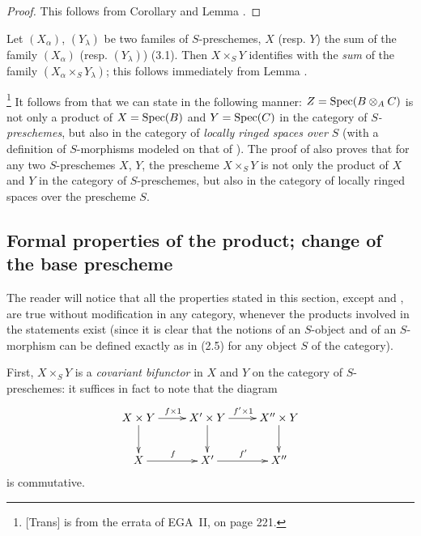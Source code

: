 \begin{proof}
\label{proof-1.3.2.7}
This follows from Corollary  and Lemma .
\end{proof}

\begin{env}[3.2.8]
\label{1.3.2.8}
Let $(X_\alpha)$, $(Y_\lambda)$ be two familes of $S$-preschemes, $X$ (resp. $Y$) the sum
of the family $(X_\alpha)$ (resp. $(Y_\lambda)$) (3.1). Then $X\times_S Y$ identifies with
the \emph{sum} of the family $(X_\alpha\times_S Y_\lambda)$; this follows immediately from
Lemma .
\end{env}

\begin{env}[3.2.9]
\label{1.3.2.9}
\footnote{[Trans]  is from the errata of EGA~II, on page 221.}
It follows from  that we can state  in the following
manner: $Z={\mathop{\mathrm{Spec}}\nolimits}(B\otimes_A C)$ is not only a product of $X={\mathop{\mathrm{Spec}}\nolimits}(B)$ and $Y={\mathop{\mathrm{Spec}}\nolimits}(C)$ in the
category of \emph{$S$-preschemes}, but also in the category of \emph{locally ringed spaces
over $S$} (with a definition of $S$-morphisms modeled on that of ). The
proof of  also proves that for any two $S$-preschemes $X$, $Y$, the
prescheme $X\times_S Y$ is not only the product of $X$ and $Y$ in the category of
$S$-preschemes, but also in the category of locally ringed spaces over the prescheme $S$.
\end{env}

\subsection{Formal properties of the product; change of the base prescheme}
\label{subsection-product-formal-and-base-change}

\begin{env}[3.3.1]
\label{1.3.3.1}
The reader will notice that all the properties stated in this section, except
 and , are true without modification in any
category, whenever the products involved in the statements exist (since it is
clear that the notions of an $S$-object and of an $S$-morphism can be defined
exactly as in (2.5) for any object $S$ of the category).
\end{env}

\begin{env}[3.3.2]
\label{1.3.3.2}
First, $X\times_S Y$ is a \emph{covariant bifunctor} in $X$ and $Y$ on the
category of $S$-preschemes: it suffices in fact to note that the diagram
\[
  \xymatrix{
    X\times Y\ar[r]^{f\times 1}\ar[d] &
    X'\times Y\ar[r]^{f'\times 1}\ar[d] &
    X''\times Y\ar[d]\\
    X\ar[r]^f &
    X'\ar[r]^{f'} &
    X''
  }
\]
is commutative.
\end{env}

